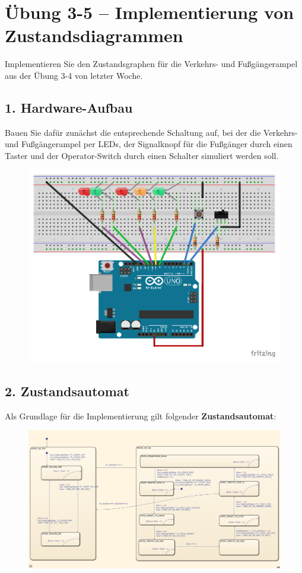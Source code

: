 \documentclass[
    fontsize=12pt,                      %
    paper=a4,                           %
    twoside=off,                       %
    DIV=15,                             %
    BCOR=12mm,                          %
    headings=normal,                    %
    headsepline=false,                   %
    footsepline=false,                  %
    headinclude=true,                   %
    footinclude=false,                  %
    toc=listof,                         %
    toc=bib,                            %
    chapterprefix=false,                %
    appendixprefix=false,               %
    numbers=noendperiod,                %
    captions=tableabove,                %
    footnotes=multiple,                 %
    bibliography=oldstyle,              %
    draft=false,                        %
]{scrreprt}
\begin{document}
\chapter*{Übung 3-5 -- Implementierung von Zustandsdiagrammen}

Implementieren Sie den Zustandsgraphen für die Verkehrs- und Fußgängerampel aus der Übung 3-4 von letzter Woche. 

\section*{1. Hardware-Aufbau}
Bauen Sie dafür zunächst die entsprechende Schaltung auf, bei der die Verkehrs- und Fußgängerampel per LEDs, der Signalknopf für die Fußgänger durch einen Taster und der Operator-Switch durch einen Schalter simuliert werden soll.
\noindent

\begin{figure}[H]
	\centering
	\includegraphics[width=\textwidth]{Figures/TrafficLight_Steckplatine}
\end{figure}

\section*{2. Zustandsautomat}
Als Grundlage für die Implementierung gilt folgender \textbf{Zustandsautomat}:
\begin{figure}[H]
	\centering
\includegraphics[width=\textwidth]{Figures/SM_TrafficLight_Traffic_Control}
\end{figure}
\end{document}
